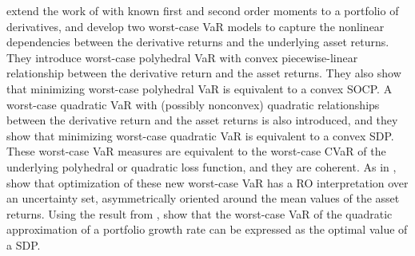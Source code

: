 \documentclass[final,onefignum,onetabnum]{class}
\begin{document}
\citet{zymler2013VaR} extend the work of \citet{ghaoui2003worst}  with known first and second order moments to a portfolio of derivatives, and develop two worst-case VaR models to capture the nonlinear dependencies between
the derivative returns and the underlying asset
returns. They introduce worst-case polyhedral VaR with convex piecewise-linear relationship between the derivative return and the asset returns. They also show that minimizing worst-case polyhedral VaR is equivalent to a convex SOCP.  A worst-case quadratic VaR with (possibly nonconvex) quadratic relationships between the derivative return and the asset returns is also introduced,  and they show that minimizing worst-case quadratic VaR is equivalent to a convex SDP. These worst-case VaR measures are equivalent to the worst-case CVaR of the underlying polyhedral or quadratic loss function, and they are coherent. As in \citet{ghaoui2003worst}, \citet{zymler2013VaR} show that optimization of these new worst-case VaR has a RO interpretation over an uncertainty set, asymmetrically oriented
around the mean values of the asset returns. 
Using the result from \citet{zymler2013Chance}, 
\citet{rujeerapaiboon2016} show that the worst-case VaR of the quadratic approximation of a  portfolio
growth rate can be expressed as the optimal value
of a SDP. 

\end{document}
